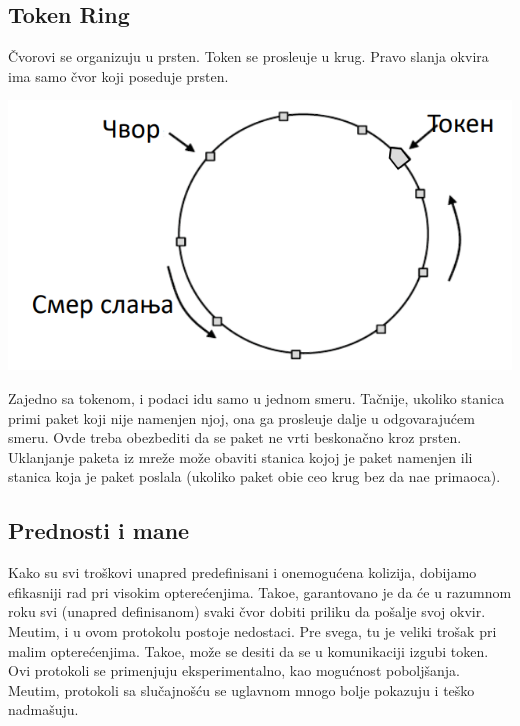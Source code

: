 \documentclass{article} %
\begin{document}
\subsection{Token Ring}

\v{C}vorovi se organizuju u prsten. Token se prosle\dj{}uje u krug. Pravo slanja okvira ima samo \v{c}vor koji poseduje prsten.

\begin{center}
\includegraphics[scale=0.3]{token-ring}
\end{center}

Zajedno sa tokenom, i podaci idu samo u jednom smeru. Ta\v{c}nije, ukoliko stanica primi paket koji nije namenjen njoj, ona ga prosle\dj{}uje dalje u odgovaraju\'{c}em smeru. Ovde treba obezbediti da se paket ne vrti beskona\v{c}no kroz prsten. Uklanjanje paketa iz mre\v{z}e mo\v{z}e obaviti stanica kojoj je paket namenjen ili stanica koja je paket poslala (ukoliko paket obi\dj{}e ceo krug bez da na\dj{}e primaoca).

\subsection{Prednosti i mane}

Kako su svi tro\v{s}kovi unapred predefinisani i onemogu\'{c}ena kolizija, dobijamo efikasniji rad pri visokim optere\'{c}enjima. Tako\dj{}e, garantovano je da \'{c}e u razumnom roku svi (unapred definisanom) svaki \v{c}vor dobiti priliku da po\v{s}alje svoj okvir. Me\dj{}utim, i u ovom protokolu postoje nedostaci. Pre svega, tu je veliki tro\v{s}ak pri malim optere\'{c}enjima. Tako\dj{}e, mo\v{z}e se desiti da se u komunikaciji izgubi token. Ovi protokoli se primenjuju eksperimentalno, kao mogu\'{c}nost pobolj\v{s}anja. Me\dj{}utim, protokoli sa slu\v{c}ajno\v{s}\'{c}u se uglavnom mnogo bolje pokazuju i te\v{s}ko nadma\v{s}uju.
\end{document}
